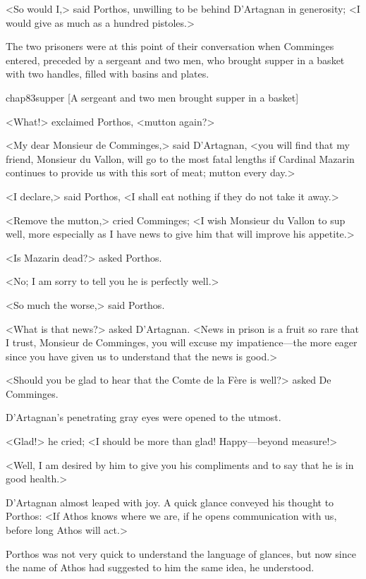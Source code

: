 <So would I,> said Porthos, unwilling to be behind D'Artagnan in generosity; <I would give as much as a hundred pistoles.>

The two prisoners were at this point of their conversation when Comminges entered, preceded by a sergeant and two men, who brought supper in a basket with two handles, filled with basins and plates.

\begin{bwbigpic}
	[\basicscale] 
	{chap83supper}
	[A sergeant and two men brought supper in a basket]
\end{bwbigpic}

<What!> exclaimed Porthos, <mutton again?>

<My dear Monsieur de Comminges,> said D'Artagnan, <you will find that my friend, Monsieur du Vallon, will go to the most fatal lengths if Cardinal Mazarin continues to provide us with this sort of meat; mutton every day.>

<I declare,> said Porthos, <I shall eat nothing if they do not take it away.>

<Remove the mutton,> cried Comminges; <I wish Monsieur du Vallon to sup well, more especially as I have news to give him that will improve his appetite.>

<Is Mazarin dead?> asked Porthos.

<No; I am sorry to tell you he is perfectly well.>

<So much the worse,> said Porthos.

<What is that news?> asked D'Artagnan. <News in prison is a fruit so rare that I trust, Monsieur de Comminges, you will excuse my impatience—the more eager since you have given us to understand that the news is good.>

<Should you be glad to hear that the Comte de la Fère is well?> asked De Comminges.

D'Artagnan's penetrating gray eyes were opened to the utmost.

<Glad!> he cried; <I should be more than glad! Happy—beyond measure!>

<Well, I am desired by him to give you his compliments and to say that he is in good health.>

D'Artagnan almost leaped with joy. A quick glance conveyed his thought to Porthos: <If Athos knows where we are, if he opens communication with us, before long Athos will act.>

Porthos was not very quick to understand the language of glances, but now since the name of Athos had suggested to him the same idea, he understood.

